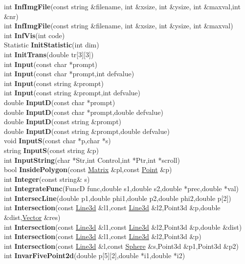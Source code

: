 \documentclass[10pt,titlepage]{article}
\def\functionlistentry#1#2#3#4#5#6{\noindent #1 {\bf #2}(#3) \dotfill #6\\}
\def\letterref#1{}
\def\letterlabelend#1{}
\begin{document}
{{\letterref{If}
\letterref{Im}
\letterref{In}
\letterref{Is}
\letterlabelend{In}
\functionlistentry{int}{InfImgFile}{const string \&filename, int \&xsize, int \&ysize, int \&maxval,int \&nr}{117}{imageio}{}
\functionlistentry{int}{InfImgFile}{const string \&filename, int \&xsize, int \&ysize, int \&maxval}{118}{imageio}{}
\functionlistentry{int}{InfVis}{int code}{99}{Visualisierung}{}
\functionlistentry{Statistic}{InitStatistic}{int dim}{1594}{obsolet}{}
\functionlistentry{int}{InitTrans}{double tr[3][3]}{1584}{obsolet}{}
\functionlistentry{int}{Input}{const char *prompt}{1433}{genericTools}{}
\functionlistentry{int}{Input}{const char *prompt,int defvalue}{1434}{genericTools}{}
\functionlistentry{int}{Input}{const string \&prompt}{1435}{genericTools}{}
\functionlistentry{int}{Input}{const string \&prompt,int defvalue}{1436}{genericTools}{}
\functionlistentry{double}{InputD}{const char *prompt}{1437}{genericTools}{}
\functionlistentry{double}{InputD}{const char *prompt,double defvalue}{1438}{genericTools}{}
\functionlistentry{double}{InputD}{const string \&prompt}{1439}{genericTools}{}
\functionlistentry{double}{InputD}{const string \&prompt,double defvalue}{1440}{genericTools}{}
\functionlistentry{void}{InputS}{const char *p,char *s}{1441}{genericTools}{}
\functionlistentry{string}{InputS}{const string \&p}{1442}{genericTools}{}
\functionlistentry{int}{InputString}{char *Str,int Control,int *Ptr,int *scroll}{1443}{genericTools}{}
\functionlistentry{bool}{InsidePolygon}{const \hyperlink{Matrix}{Matrix} \&pl,const \hyperlink{Point}{Point} \&p}{280}{datastructures}{}
\functionlistentry{int}{Integer}{const string\& s}{1409}{genericTools}{}
\functionlistentry{int}{IntegrateFunc}{FuncD func,double s1,double s2,double *prec,double *val}{1402}{numeric}{}
\functionlistentry{int}{IntersecLine}{double p1,double phi1,double p2,double phi2,double p[2]}{1377}{numeric}{}
\functionlistentry{int}{Intersection}{const \hyperlink{Line3d}{Line3d} \&l1,const \hyperlink{Line3d}{Line3d} \&l2,Point3d \&p,double \&dist,\hyperlink{Vector}{Vector} \&res}{1388}{numeric}{}
\functionlistentry{int}{Intersection}{const \hyperlink{Line3d}{Line3d} \&l1,const \hyperlink{Line3d}{Line3d} \&l2,Point3d \&p,double \&dist}{1389}{numeric}{}
\functionlistentry{int}{Intersection}{const \hyperlink{Line3d}{Line3d} \&l1,const \hyperlink{Line3d}{Line3d} \&l2,Point3d \&p}{1390}{numeric}{}
\functionlistentry{int}{Intersection}{const \hyperlink{Line3d}{Line3d} \&l,const \hyperlink{Sphere}{Sphere} \&s,Point3d \&p1,Point3d \&p2}{1391}{numeric}{}
\functionlistentry{int}{InvarFivePoint2d}{double p[5][2],double *i1,double *i2}{1383}{numeric}{}
}}
\end{document}

